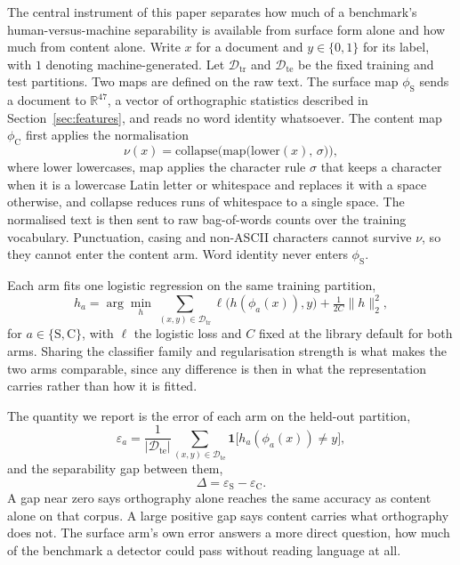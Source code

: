 The central instrument of this paper separates how much of a benchmark's human-versus-machine separability is available from surface form alone and how much from content alone. Write $x$ for a document and $y \in \{0, 1\}$ for its label, with $1$ denoting machine-generated. Let $\mathcal{D}_{\text{tr}}$ and $\mathcal{D}_{\text{te}}$ be the fixed training and test partitions. Two maps are defined on the raw text. The surface map $\phi_{\mathrm{S}}$ sends a document to $\mathbb{R}^{47}$, a vector of orthographic statistics described in Section~\ref{sec:features}, and reads no word identity whatsoever. The content map $\phi_{\mathrm{C}}$ first applies the normalisation
\begin{equation}
\label{eq:norm}
\nu(x) = \mathrm{collapse}\Big(\mathrm{map}\big(\mathrm{lower}(x),\, \sigma\big)\Big),
\end{equation}
where $\mathrm{lower}$ lowercases, $\mathrm{map}$ applies the character rule $\sigma$ that keeps a character when it is a lowercase Latin letter or whitespace and replaces it with a space otherwise, and $\mathrm{collapse}$ reduces runs of whitespace to a single space. The normalised text is then sent to raw bag-of-words counts over the training vocabulary. Punctuation, casing and non-ASCII characters cannot survive $\nu$, so they cannot enter the content arm. Word identity never enters $\phi_{\mathrm{S}}$.

Each arm fits one logistic regression on the same training partition,
\begin{equation}
\label{eq:arm}
h_{a}  =  \arg\min_{h} \, \sum_{(x,y) \in \mathcal{D}_{\text{tr}}} \ell\big(h(\phi_{a}(x)), y\big)  +  \tfrac{1}{2C}\lVert h \rVert_2^2 ,
\end{equation}
for $a \in \{\mathrm{S}, \mathrm{C}\}$, with $\ell$ the logistic loss and $C$ fixed at the library default for both arms. Sharing the classifier family and regularisation strength is what makes the two arms comparable, since any difference is then in what the representation carries rather than how it is fitted.

The quantity we report is the error of each arm on the held-out partition,
\begin{equation}
\label{eq:err}
\varepsilon_{a}  =  \frac{1}{|\mathcal{D}_{\text{te}}|}\sum_{(x,y)\in\mathcal{D}_{\text{te}}} \mathbf{1}\big[h_{a}(\phi_{a}(x)) \neq y\big],
\end{equation}
and the separability gap between them,
\begin{equation}
\label{eq:gap}
\Delta  =  \varepsilon_{\mathrm{S}} - \varepsilon_{\mathrm{C}} .
\end{equation}
A gap near zero says orthography alone reaches the same accuracy as content alone on that corpus. A large positive gap says content carries what orthography does not. The surface arm's own error answers a more direct question, how much of the benchmark a detector could pass without reading language at all.

